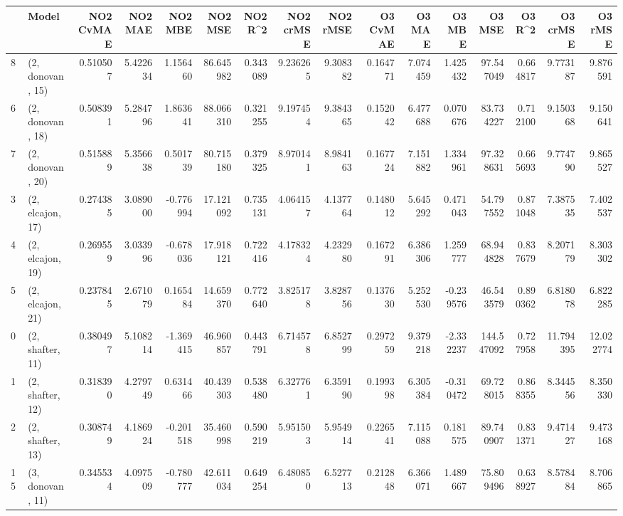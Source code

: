 \begin{tabular}{llrrrrrrrrrrrrrr}
\toprule
{} &             Model &  NO2 CvMAE &   NO2 MAE &   NO2 MBE &    NO2 MSE &   NO2 R\textasciicircum2 &  NO2 crMSE &  NO2 rMSE &  O3 CvMAE &    O3 MAE &    O3 MBE &      O3 MSE &    O3 R\textasciicircum2 &   O3 crMSE &    O3 rMSE \\
\midrule
8  &  (2, donovan, 15) &   0.510507 &  5.422634 &  1.156460 &  86.645982 &  0.343089 &   9.236265 &  9.308382 &  0.164771 &  7.074459 &  1.425432 &   97.547049 &  0.664817 &   9.773187 &   9.876591 \\
6  &  (2, donovan, 18) &   0.508391 &  5.284796 &  1.863641 &  88.066310 &  0.321255 &   9.197454 &  9.384365 &  0.152042 &  6.477688 &  0.070676 &   83.734227 &  0.712100 &   9.150368 &   9.150641 \\
7  &  (2, donovan, 20) &   0.515889 &  5.356638 &  0.501739 &  80.715180 &  0.379325 &   8.970141 &  8.984163 &  0.167724 &  7.151882 &  1.334961 &   97.328631 &  0.665693 &   9.774790 &   9.865527 \\
3  &  (2, elcajon, 17) &   0.274385 &  3.089000 & -0.776994 &  17.121092 &  0.735131 &   4.064157 &  4.137764 &  0.148012 &  5.645292 &  0.471043 &   54.797552 &  0.871048 &   7.387535 &   7.402537 \\
4  &  (2, elcajon, 19) &   0.269559 &  3.033996 & -0.678036 &  17.918121 &  0.722416 &   4.178324 &  4.232980 &  0.167291 &  6.386306 &  1.259777 &   68.944828 &  0.837679 &   8.207179 &   8.303302 \\
5  &  (2, elcajon, 21) &   0.237845 &  2.671079 &  0.165484 &  14.659370 &  0.772640 &   3.825178 &  3.828756 &  0.137630 &  5.252530 & -0.239576 &   46.543579 &  0.890362 &   6.818078 &   6.822285 \\
0  &  (2, shafter, 11) &   0.380497 &  5.108214 & -1.369415 &  46.960857 &  0.443791 &   6.714578 &  6.852799 &  0.297259 &  9.379218 & -2.332237 &  144.547092 &  0.727958 &  11.794395 &  12.022774 \\
1  &  (2, shafter, 12) &   0.318390 &  4.279749 &  0.631466 &  40.439303 &  0.538480 &   6.327761 &  6.359190 &  0.199398 &  6.305384 & -0.310472 &   69.728015 &  0.868355 &   8.344556 &   8.350330 \\
2  &  (2, shafter, 13) &   0.308749 &  4.186924 & -0.201518 &  35.460998 &  0.590219 &   5.951503 &  5.954914 &  0.226541 &  7.115088 &  0.181575 &   89.740907 &  0.831371 &   9.471427 &   9.473168 \\
15 &  (3, donovan, 11) &   0.345534 &  4.097509 & -0.780777 &  42.611034 &  0.649254 &   6.480850 &  6.527713 &  0.212848 &  6.366071 &  1.489667 &   75.809496 &  0.638927 &   8.578484 &   8.706865 \\

\end{tabular}
